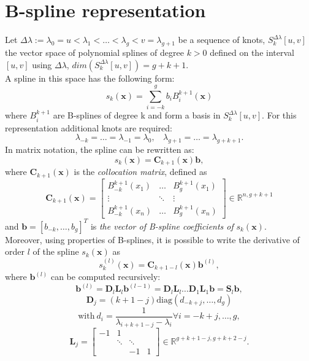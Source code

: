 \section{B-spline representation}
Let $\Delta\lambda := \lambda_0=u < \lambda_1< \dots < \lambda_g < v = \lambda_{g+1} $ be a sequence of knots, $S_k^{\Delta\lambda}[u,v]$ the vector space of polynomial splines of degree $k > 0$ defined on the interval $[u,v]$ using $\Delta\lambda$, $dim(S_k^{\Delta\lambda}[u,v]) = g + k + 1$. \\
A spline in this space has the following form:
\[  s_k(\textbf{x})=\sum\limits_{i=-k}^{g}b_iB_i^{k+1}(\textbf{x}) \]
where ${B_i^{k+1}}$ are B-splines of degree k and form a basis in $S_k^{\Delta\lambda}[u,v]$. For this representation additional knots are required:
\[  \lambda_{-k}= \dots = \lambda_{-1} = \lambda_0,  \ \ \ \ \lambda_{g+1}= \dots = \lambda_{g+k+1}. \]
In matrix notation, the spline can be rewritten as:
\[  s_k(\textbf{x})=  \textbf{C}_{k+1}(\textbf{x})\textbf{b}, \]
where $ \textbf{C}_{k+1}(\textbf{x})$ is the \textit{collocation matrix}, defined as
\[  \textbf{C}_{k+1}(\textbf{x}) =
\begin{bmatrix}
B_{-k}^{k+1}(x_1)  & \dots  & B_{g}^{k+1}(x_1) \\
\vdots & \ddots & \vdots \\
B_{-k}^{k+1}(x_n) &  \dots  & B_{g}^{k+1}(x_n)
\end{bmatrix} \in \mathbb{R}^{n, g+k+1} \]
and  $\textbf{b}= [ b_{-k}, \dots, b_{g}]^T$ is \textit{the vector of B-spline coefficients of} $s_k(\textbf{x})$.\\
Moreover, using properties of B-splines, it is possible to write the derivative of order $l$ of the spline $s_k(\textbf{x})$ as
\[  s_k^{(l)}(\textbf{x})=  \textbf{C}_{k+1-l}(\textbf{x})\textbf{b}^{(l)}, \]
where $\textbf{b}^{(l)}$ can be computed recursively:
\[ \textbf{b}^{(l)} = \textbf{D}_l \textbf{L}_l \textbf{b}^{(l-1)}   =  \textbf{D}_l \textbf{L}_l \dots \textbf{D}_1 \textbf{L}_1\textbf{b} = \textbf{S}_l\textbf{b}, \]
\[ \textbf{D}_j =  (k+1-j) \text{diag}(d_{-k+j},\dots, d_g)    \]
\[ \text{with} \ d_i = \frac{1}{\lambda_{i+k+1-j}-\lambda_i}   \forall i = -k+j,\dots, g,  \]
\[ \textbf{L}_j =  \begin{bmatrix}
-1  & 1 &  &\\
 & \ddots & \ddots&\\
 & & -1&1
\end{bmatrix}  \in \mathbb{R}^{g+k+1-j,g+k+2-j}.\]

